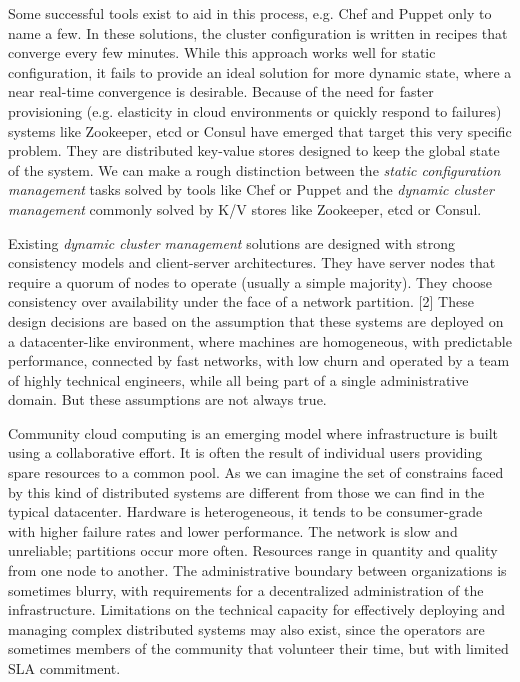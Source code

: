 \documentclass{sig-alternate}
\begin{document}
Some successful tools exist to aid in this process, e.g. Chef and Puppet only to name a few. In these solutions, the cluster configuration is written in recipes that converge every few minutes. While this approach works well for static configuration, it fails to provide an ideal solution for more dynamic state, where a near real-time convergence is desirable. Because of the need for faster provisioning (e.g. elasticity in cloud environments or quickly respond to failures) systems like Zookeeper, etcd or Consul have emerged that target this very specific problem. They are distributed key-value stores designed to keep the global state of the system. We can make a rough distinction between the \textit{static configuration management} tasks solved by tools like Chef or Puppet and the \textit{dynamic cluster management} commonly solved by K/V stores like Zookeeper, etcd or Consul.

Existing \textit{dynamic cluster management} solutions are designed with strong consistency models and client-server architectures. They have server nodes that require a quorum of nodes to operate (usually a simple majority). They choose consistency over availability under the face of a network partition. 
[2] These design decisions are based on the assumption that these systems are deployed on a datacenter-like environment, where machines are homogeneous, with predictable performance, connected by fast networks, with low churn and operated by a team of highly technical engineers, while all being part of a single administrative domain. But these assumptions are not always true.

Community cloud computing is an emerging model where infrastructure is built using a collaborative effort. It is often the result of individual users providing spare resources to a common pool. As we can imagine the set of constrains faced by this kind of distributed systems are different from those we can find in the typical datacenter. Hardware is heterogeneous, it tends to be consumer-grade with higher failure rates and lower performance. The network is slow and unreliable; partitions occur more often. Resources range in quantity and quality from one node to another. The administrative boundary between organizations is sometimes blurry, with requirements for a decentralized administration of the infrastructure. Limitations on the technical capacity for effectively deploying and managing complex distributed systems may also exist, since the operators are sometimes members of the community that volunteer their time, but with limited SLA commitment.
\end{document}
